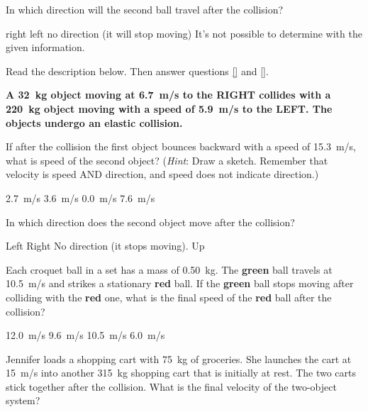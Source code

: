 \documentclass{exam}
\begin{document}
\begin{questions}
\question \label{jlNXIi}
In which direction will the second ball travel after the collision?

\begin{randomizechoices}
\correctchoice right
\choice left
\choice no direction (it will stop moving)
\choice It's not possible to determine with the given information.
\end{randomizechoices}

\cyanhrule

\begin{EnvUplevel}
Read the description below. Then answer questions \ref{} and \ref{}.

\textbf{A \SI{32}{kg} object moving at \SI{6.7}{m/s} to the RIGHT collides with a \SI{220}{kg} object moving with a speed of \SI{5.9}{m/s} to the LEFT. The objects undergo an elastic collision.}
\end{EnvUplevel}

\question
 If after the collision the first object bounces backward with a speed of \SI{15.3}{m/s}, what is speed of the second object? (\textit{Hint}: Draw a sketch. Remember that velocity is speed AND direction, and speed does not indicate direction.)

\begin{randomizechoices}
\correctchoice \SI{2.7}{m/s}
\choice \SI{3.6}{m/s}
\choice \SI{0.0}{m/s}
\choice \SI{7.6}{m/s}
\end{randomizechoices}

 \question
 In which direction does the second object move after the collision?

\begin{randomizechoices}
\correctchoice Left
\choice Right
\choice No direction (it stops moving).
\choice Up
\end{randomizechoices}

\cyanhrule

\clearpage
\question
Each croquet ball in a set has a mass of \SI{0.50}{kg}. The \textbf{green} ball travels at \SI{10.5}{m/s} and strikes a stationary \textbf{red} ball. If the \textbf{green} ball stops moving after colliding with the \textbf{red} one, what is the final speed of the \textbf{red} ball after the collision?

\begin{randomizechoices}
\choice \SI{12.0}{m/s}
\choice \SI{9.6}{m/s}
\correctchoice \SI{10.5}{m/s}
\choice \SI{6.0}{m/s}
\end{randomizechoices}

\question
Jennifer loads a shopping cart with \SI{75}{kg} of groceries. She launches the cart at \SI{15}{m/s} into another \SI{315}{kg} shopping cart that is initially at rest. The two carts stick together after the collision. What is the final velocity of the two-object system?


\end{questions}
\end{document}
